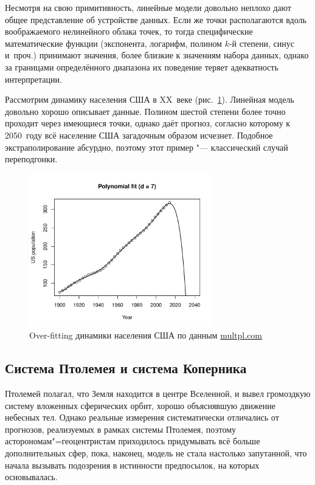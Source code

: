 \documentclass[11pt]{article}
\begin{document}
Несмотря на свою примитивность, линейные модели довольно неплохо дают общее представление об устройстве данных. Если же точки располагаются вдоль воображаемого нелинейного облака точек, то тогда специфические математические функции (экспонента, логарифм, полином $k$-й степени, синус и~проч.) принимают значения, более близкие к значениям набора данных, однако за границами определённого диапазона их поведение теряет адекватность интерпретации.

Рассмотрим динамику населения США в XX~веке (рис.~\ref{fig:usa}). Линейная модель довольно хорошо описывает данные. Полином шестой степени более точно проходит через имеющиеся точки, однако даёт прогноз, согласно которому к 2050~году всё население США загадочным образом исчезнет. Подобное экстраполирование абсурдно, поэтому этот пример "--- классический случай переподгонки.

\begin{figure}[htbp]
	\centering
	\includegraphics[width=8cm]{overfit.pdf}
	\caption{Over-fitting динамики населения США по данным \href{http://www.multpl.com/united-states-population/table}{multpl.com}} \label{fig:usa}
\end{figure}

\subsection{Система Птолемея и система Коперника}

Птолемей полагал, что Земля находится в центре Вселенной, и вывел громоздкую систему вложенных сферических орбит, хорошо объяснявшую движение небесных тел. Однако реальные измерения систематически отличались от прогнозов, реализуемых в рамках системы Птолемея, поэтому асторономам"=геоцентристам приходилось придумывать всё больше дополнительных сфер, пока, наконец, модель не стала настолько запутанной, что начала вызывать подозрения в истинности предпосылок, на которых основывалась. 
\end{document}
